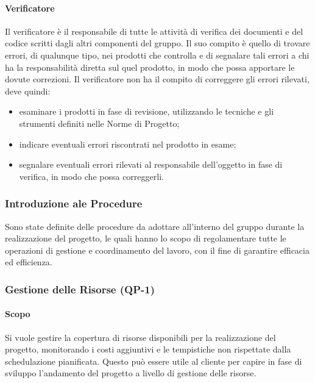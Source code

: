 		\paragraph{Verificatore}

			Il verificatore è il responsabile di tutte le attività di verifica dei documenti e del codice scritti dagli altri componenti del gruppo. Il suo compito è quello di trovare errori, di qualunque tipo, nei prodotti che controlla e di segnalare tali errori a chi ha la responsabilità diretta sul quel prodotto, in modo che possa apportare le dovute correzioni.
			\newline
			Il verificatore non ha il compito di correggere gli errori rilevati, deve quindi:

			\begin{itemize}
				\item esaminare i prodotti in fase di revisione, utilizzando le tecniche e gli strumenti definiti nelle Norme di Progetto;
				\item indicare eventuali errori riscontrati nel prodotto in esame;
				\item segnalare eventuali errori rilevati al responsabile dell'oggetto in fase di verifica, in modo che possa correggerli.
			\end{itemize}

	\subsubsection{Introduzione ale Procedure}

		Sono state definite delle procedure da adottare all'interno del gruppo durante la realizzazione del progetto, le quali hanno lo scopo di regolamentare tutte le operazioni di gestione e coordinamento del lavoro, con il fine di garantire efficacia ed efficienza.


		\subsubsection{Gestione delle Risorse (QP-1)}

			\paragraph{Scopo}

				Si vuole gestire la copertura di risorse disponibili per la realizzazione del progetto, monitorando i costi aggiuntivi e le tempistiche non rispettate dalla schedulazione pianificata. Questo può essere utile al cliente per capire in fase di sviluppo l'andamento del progetto a livello di gestione delle risorse.

